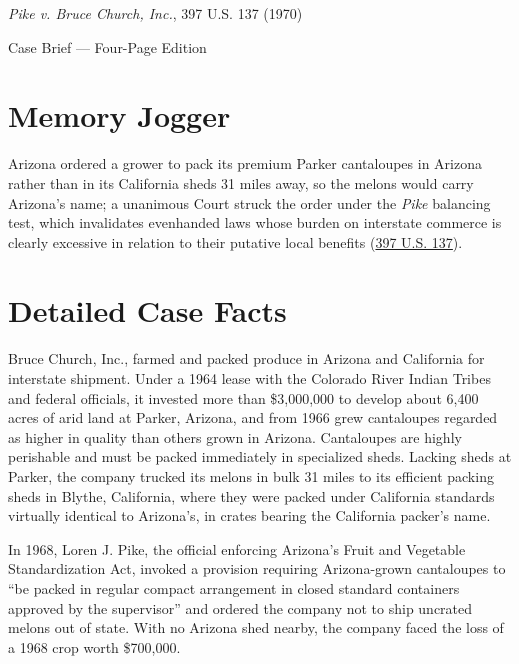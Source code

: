 \documentclass[12pt]{article}
\begin{document}
\begin{center}
{\LARGE \textit{Pike v. Bruce Church, Inc.}, 397 U.S. 137 (1970)\par}
\vspace{0.8em}
{\large Case Brief --- Four-Page Edition\par}
\end{center}
\vspace{1em}

\section{Memory Jogger}

Arizona ordered a grower to pack its premium Parker cantaloupes in Arizona rather than in its California sheds 31 miles away, so the melons would carry Arizona's name; a unanimous Court struck the order under the \textit{Pike} balancing test, which invalidates evenhanded laws whose burden on interstate commerce is clearly excessive in relation to their putative local benefits (\href{https://supreme.justia.com/cases/federal/us/397/137/}{397 U.S. 137}).

\section{Detailed Case Facts}

Bruce Church, Inc., farmed and packed produce in Arizona and California for interstate shipment. Under a 1964 lease with the Colorado River Indian Tribes and federal officials, it invested more than \$3,000,000 to develop about 6,400 acres of arid land at Parker, Arizona, and from 1966 grew cantaloupes regarded as higher in quality than others grown in Arizona. Cantaloupes are highly perishable and must be packed immediately in specialized sheds. Lacking sheds at Parker, the company trucked its melons in bulk 31 miles to its efficient packing sheds in Blythe, California, where they were packed under California standards virtually identical to Arizona's, in crates bearing the California packer's name.

In 1968, Loren J. Pike, the official enforcing Arizona's Fruit and Vegetable Standardization Act, invoked a provision requiring Arizona-grown cantaloupes to ``be packed in regular compact arrangement in closed standard containers approved by the supervisor'' and ordered the company not to ship uncrated melons out of state. With no Arizona shed nearby, the company faced the loss of a 1968 crop worth \$700,000.
\end{document}
